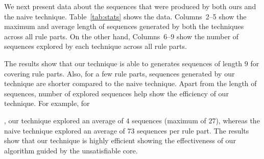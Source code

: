 We next present data about the sequences that were produced by both ours and
the naive technique. Table~\ref{tab:stats} shows the data. Columns~2--5 show
the maximum and average length of sequences generated by both the techniques
across all rule parts. On the other hand, Columns~6--9 show the number of 
sequences explored by each technique across all rule parts. 

The results show that our technique is able to generates sequences of length $9$
for covering rule parts. Also, for a few rule parts, sequences generated by our technique are shorter
compared to the naive technique. Apart from the length of sequences, number
of explored sequences help show the efficiency of our technique. For example,
for \subject{Cebu-pacific}, our technique explored an average of $4$ sequences
(maximum of $27$), whereas the naive technique explored an average of $73$ sequences
per rule part. The results show that our technique is highly efficient showing
the effectiveness of our algorithm guided by the unsatisfiable core.
